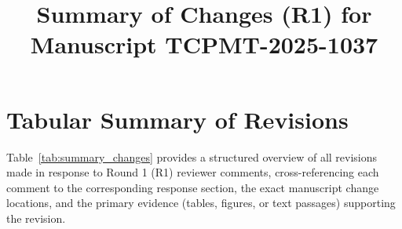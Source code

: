 \documentclass[conference]{IEEEtran}
\begin{document}
\title{Summary of Changes (R1) for Manuscript TCPMT-2025-1037}

\author{
}

\maketitle

\section*{Tabular Summary of Revisions}
Table~\ref{tab:summary_changes} provides a structured overview of all revisions made in response to Round 1 (R1) reviewer comments, cross-referencing each comment to the corresponding response section, the exact manuscript change locations, and the primary evidence (tables, figures, or text passages) supporting the revision.
\end{document}
